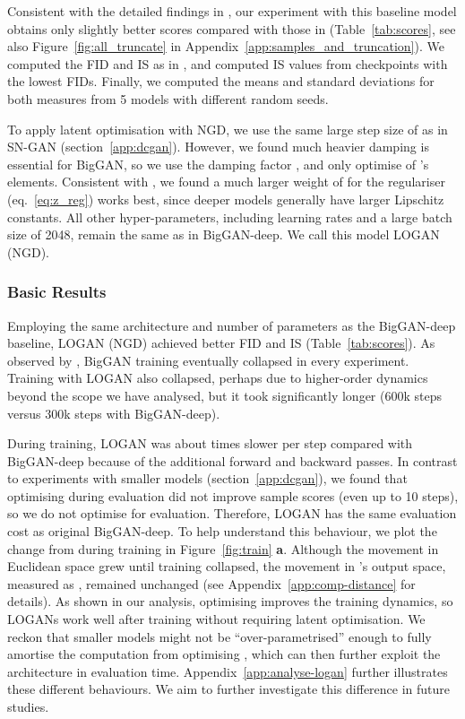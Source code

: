 \documentclass{article} \usepackage{iclr2020_conference,times}
\begin{document}
Consistent with the detailed findings in \cite{brock2018large}, our experiment with this baseline model obtains only slightly better scores compared with those in \cite{brock2018large} (Table~\ref{tab:scores}, see also Figure~\ref{fig:all_truncate} in Appendix~\ref{app:samples_and_truncation}). We computed the FID and IS as in \cite{brock2018large}, and computed IS values from checkpoints with the lowest FIDs. Finally, we computed the means and standard deviations for both measures from 5 models with different random seeds.

To apply latent optimisation with NGD, we use the same large step size of  as in SN-GAN (section~\ref{app:dcgan}). However, we found much heavier damping is essential for BigGAN, so we use the damping factor , and only optimise  of 's elements. Consistent with \citet{tanaka2019discriminator}, we found a much larger weight of  for the regulariser  (eq.~\ref{eq:z_reg}) works best, since deeper models generally have larger Lipschitz constants. All other hyper-parameters, including learning rates and a large batch size of 2048, remain the same as in BigGAN-deep. We call this model LOGAN (NGD).

\subsubsection{Basic Results}
\label{sec:biggan-basic}

Employing the same architecture and number of parameters as the BigGAN-deep baseline, LOGAN (NGD) achieved better FID and IS (Table~\ref{tab:scores}). As observed by \citet{brock2018large}, BigGAN training eventually collapsed in every experiment. Training with LOGAN also collapsed, perhaps due to higher-order dynamics beyond the scope we have analysed, but it took significantly longer (600k steps versus 300k steps with BigGAN-deep). 

During training, LOGAN was about  times slower per step compared with BigGAN-deep because of the additional forward and backward passes. In contrast to experiments with smaller models (section~\ref{app:dcgan}), we found that optimising  during evaluation did not improve sample scores (even up to 10 steps), so we do not optimise  for evaluation. Therefore, LOGAN has the same evaluation cost as original BigGAN-deep. To help understand this behaviour, we plot the change from  during training in Figure~\ref{fig:train} \textbf{a}. Although the movement in Euclidean space  grew until training collapsed, the movement in 's output space, measured as , remained unchanged (see Appendix~\ref{app:comp-distance} for details). As shown in our analysis, optimising  improves the training dynamics, so LOGANs work well after training without requiring latent optimisation. 
We reckon that smaller models might not be ``over-parametrised'' enough to fully amortise the computation from optimising , which can then further exploit the architecture in evaluation time.
Appendix~\ref{app:analyse-logan} further illustrates these different behaviours. We aim to further investigate this difference in future studies.
\end{document}
